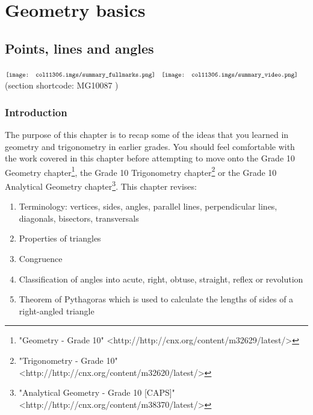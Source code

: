          \chapter{Geometry basics}
    \setcounter{figure}{1}
    \setcounter{subfigure}{1}
    \label{8eb3a75df362978731c03bbeab266515}
         \section{ Points, lines and angles}
    \nopagebreak
            \label{m39370} $ \hspace{-5pt}\begin{array}{cccccccccccc}   \texttt{[image: col11306.imgs/summary\_fullmarks.png]} &   \texttt{[image: col11306.imgs/summary\_video.png]} &   \end{array} $ \hspace{2 pt}\raisebox{-5 pt}{} {(section shortcode: MG10087 )} \par 
    \label{m39370*cid2}
            \subsection{ Introduction}
            \nopagebreak
      \label{m39370*id313235}The purpose of this chapter is to recap some of the ideas that you learned in geometry and trigonometry in earlier grades. You should feel comfortable with the work covered in this chapter before attempting to move onto the Grade 10 Geometry chapter\footnote{\raggedright{}"Geometry - Grade 10" <http://http://cnx.org/content/m32629/latest/>}, the Grade 10 Trigonometry chapter\footnote{\raggedright{}"Trigonometry - Grade 10" <http://http://cnx.org/content/m32620/latest/>} or the Grade 10 Analytical Geometry chapter\footnote{\raggedright{}"Analytical Geometry - Grade 10 [CAPS]" <http://http://cnx.org/content/m38370/latest/>}. This chapter revises:\par 
      \label{m39370*id313248}\begin{enumerate}[noitemsep, label=\textbf{\arabic*}. ] 
            \label{m39370*uid1}\item Terminology: vertices, sides, angles, parallel lines, perpendicular lines, diagonals, bisectors, transversals
\label{m39370*uid3}\item Properties of triangles
\label{m39370*uid4}\item Congruence
\label{m39370*uid5}\item Classification of angles into acute, right, obtuse, straight, reflex or revolution
\label{m39370*uid6}\item Theorem of Pythagoras which is used to calculate the lengths of sides of a right-angled triangle
\end{enumerate}
    \label{m39370*cid3}

